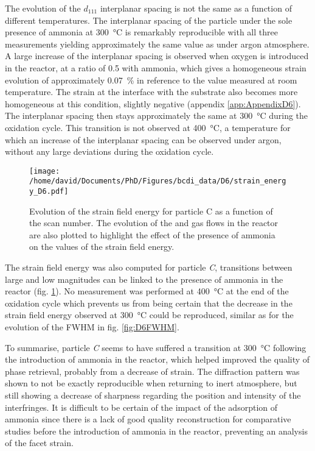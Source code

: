 The evolution of the $d_{111}$ interplanar spacing is not the same as a function of different temperatures.
The interplanar spacing of the particle under the sole presence of ammonia at \qty{300}{\degreeCelsius} is remarkably reproducible with all three measurements yielding approximately the same value as under argon atmosphere.
A large increase of the interplanar spacing is observed when oxygen is introduced in the reactor, at a ratio of \num{0.5} with ammonia, which gives a homogeneous strain evolution of approximately \qty{0.07}{\percent} in reference to the value measured at room temperature.
The strain at the interface with the substrate also becomes more homogeneous at this condition, slightly negative (appendix \ref{app:AppendixD6}).
The interplanar spacing then stays approximately the same at \qty{300}{\degreeCelsius} during the oxidation cycle.
This transition is not observed at \qty{400}{\degreeCelsius}, a temperature for which an increase of the interplanar spacing can be observed under argon, without any large deviations during the oxidation cycle.

\begin{figure}[!htb]
    \centering
    \texttt{[image: /home/david/Documents/PhD/Figures/bcdi\_data/D6/strain\_energy\_D6.pdf]}
    \caption{
        Evolution of the strain field energy for particle C as a function of the scan number.
        The evolution of the  and  gas flows in the reactor are also plotted to highlight the effect of the presence of ammonia on the values of the strain field energy.
    }
    \label{fig:D6SFE}
\end{figure}

The strain field energy was also computed for particle \textit{C}, transitions between large and low magnitudes can be linked to the presence of ammonia in the reactor (fig. \ref{fig:D6SFE}).
No measurement was performed at \qty{400}{\degreeCelsius} at the end of the oxidation cycle which prevents us from being certain that the decrease in the strain field energy observed at \qty{300}{\degreeCelsius} could be reproduced, similar as for the evolution of the FWHM in fig. \ref{fig:D6FWHM}.

To summarise, particle \textit{C} seems to have suffered a transition at \qty{300}{\degreeCelsius} following the introduction of ammonia in the reactor, which helped improved the quality of phase retrieval, probably from a decrease of strain.
The diffraction pattern was shown to not be exactly reproducible when returning to inert atmosphere, but still showing a decrease of sharpness regarding the position and intensity of the interfringes.
It is difficult to be certain of the impact of the adsorption of ammonia since there is a lack of good quality reconstruction for comparative studies before the introduction of ammonia in the reactor, preventing an analysis of the facet strain.

